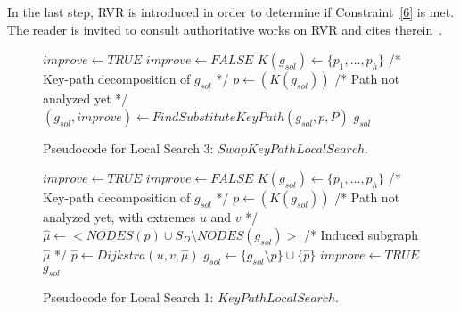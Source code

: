 \documentclass{llncs}
\begin{document}
In the last step, RVR is introduced in order to determine if Constraint~\ref{6} is met. The reader is invited to consult authoritative works on RVR and cites therein~\cite{85}.  

\begin{figure}[H]
\begin{algorithm}[H]
\caption{$g_{sol} = SwapKeyPathLocalSearch(G_B,C,g_{sol},P)$}
\begin{algorithmic}[1]
\STATE $improve \leftarrow TRUE$
\STATE $improve \leftarrow FALSE$
\STATE $K(g_{sol}) \leftarrow \{p_1,\ldots,p_h\}$ /* Key-path decomposition of $g_{sol}$ */
\STATE $p \leftarrow(K(g_{sol}))$ /* Path not analyzed yet */
\STATE $(g_{sol},improve) \leftarrow FindSubstituteKeyPath(g_{sol},p,P)$
\ENDWHILE
\ENDWHILE
\RETURN $g_{sol}$
\end{algorithmic}
\end{algorithm}
\caption{Pseudocode for Local Search 3: $SwapKeyPathLocalSearch$.\label{alg-kpls2}}
\end{figure}

\begin{figure}[H]
\begin{algorithm}[H]
\caption{$g_{sol} = KeyPathLocalSearch(G_B,C,g_{sol})$}
\begin{algorithmic}[1]
\STATE $improve \leftarrow TRUE$
\STATE $improve \leftarrow FALSE$
\STATE $K(g_{sol}) \leftarrow \{p_1,\ldots,p_h\}$ /* Key-path decomposition of $g_{sol}$ */
\STATE $p \leftarrow(K(g_{sol}))$ /* Path not analyzed yet, with extremes $u$ and $v$ */
\STATE $\hat{\mu} \leftarrow <NODES(p) \cup S_D\setminus NODES(g_{sol}) > $ /* Induced subgraph $\hat{\mu}$ */
\STATE $\hat{p} \leftarrow Dijkstra(u,v,\hat{\mu})$
\STATE $g_{sol} \leftarrow \{ g_{sol}\setminus p \} \cup \{\hat{p}\}$
\STATE $improve \leftarrow TRUE$
\ENDIF
\ENDWHILE
\ENDWHILE
\RETURN $g_{sol}$
\end{algorithmic}
\end{algorithm}
\caption{Pseudocode for Local Search 1: $KeyPathLocalSearch$.\label{alg-kpls}}
\end{figure}
\end{document}
